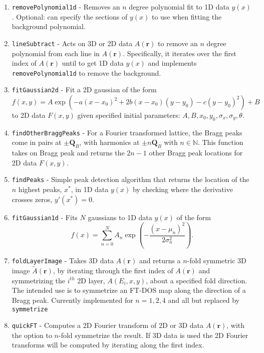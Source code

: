 \documentclass[11pt]{article}
\begin{document}
\begin{enumerate}
\item {\tt removePolynomial1d} - Removes an $n$ degree polynomial fit to 1D data $y(x)$. Optional: can specify the sections of $y(x)$ to use when fitting the background polynomial.

\item {\tt lineSubtract} - Acts on 3D or 2D data $A(\mathbf{r})$ to remove an $n$ degree polynomial from each line in $A(\mathbf{r})$.  Specifically, it iterates over the first index of $A(\mathbf{r})$ until to get 1D data $y(x)$  and implements {\small \tt removePolynomial1d} to remove the background.

\item {\tt fitGaussian2d} - Fit a 2D gaussian of the form $$f(x,y) = A \exp (-a(x-x_0)^2 +2b(x-x_0)(y-y_0) - c(y-y_0)^2 ) + B$$
to 2D data $F(x,y)$ given specified initial parameters: $A, B, x_0, y_0, \sigma_x,  \sigma_y, \theta.$

\item {\tt findOtherBraggPeaks} - For a Fourier transformed lattice, the Bragg peaks come in pairs at $\pm \mathbf{Q}_{B}$, with harmonics at  $\pm n\mathbf{Q}_{B}$ with $n\in \mathbb{N}$.  This function takes on Bragg peak and returns the $2n-1$ other Bragg peak locations for 2D data $F(x,y)$.

\item {\tt findPeaks} - Simple peak detection algorithm that returns the location of the $n$ highest peaks, $x^*$, in 1D data $y(x)$ by checking where the derivative crosses zeros, $y'(x^*)=0$.

\item {\tt fitGaussian1d} - Fits $N$ gaussians to 1D data $y(x)$ of the form $$f(x) = \sum_{n=0}^N A_n \exp (-\frac{(x-\mu_n)^2}{2\sigma_n^2}).$$

\item {\tt foldLayerImage} - Takes 3D data $A(\mathbf{r})$ and returns a $n$-fold symmetric 3D image $\tilde{A}(\mathbf{r})$, by iterating through the first index of $A(\mathbf{r})$ and symmetrizing the $i^{th}$ 2D layer, $A(E_i,x,y)$, about a specified fold direction.  The intended use is to symmetrize an FT-DOS map along the direction of a Bragg peak. Currently implemented for $n=1,2,4$ and all but replaced by {\tt \small symmetrize}

\item {\tt quickFT} - Computes a 2D Fourier transform of 2D or 3D data $A(\mathbf{r})$, with the option to $n$-fold symmetrize the result.  If 3D data is used the 2D Fourier transforms will be computed by iterating along the first index.


\end{enumerate}
\end{document}
